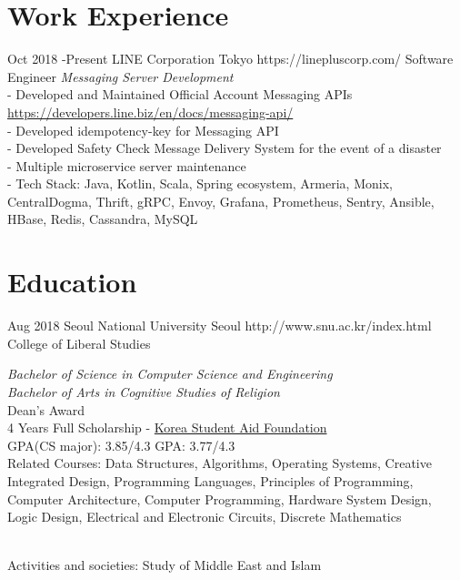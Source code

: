 \documentclass[10pt]{article} %
\begin{document}

\section{Work Experience}

\job
{Oct 2018 -}{Present}
{LINE Corporation}
{Tokyo}
{https://linepluscorp.com/}
{Software Engineer}
{
\textit{Messaging Server Development}\\
- Developed and Maintained Official Account Messaging APIs \href{https://developers.line.biz/en/docs/messaging-api/}{https://developers.line.biz/en/docs/messaging-api/}\\
- Developed idempotency-key for Messaging API\\
- Developed Safety Check Message Delivery System for the event of a disaster\\
- Multiple microservice server maintenance\\
- Tech Stack: Java, Kotlin, Scala, Spring ecosystem, Armeria, Monix, CentralDogma, Thrift, gRPC, Envoy, Grafana, Prometheus, Sentry, Ansible, HBase, Redis, Cassandra, MySQL
}



\section{Education}

\job
{Aug 2018}{}
{Seoul National University}
{Seoul}
{http://www.snu.ac.kr/index.html}
{College of Liberal Studies}
{
\textit{Bachelor of Science in Computer Science and Engineering}\\
\if{}
\textit{Bachelor of Arts in Cognitive Studies of Religion}\\
\fi
Dean's Award\\
4 Years Full Scholarship - \href{http://eng.kosaf.go.kr/jsp/main.jsp}{Korea Student Aid Foundation}\\
\if{}
GPA(CS major): 3.85/4.3\hspace{10mm} GPA: 3.77/4.3\\
Related Courses: Data Structures, Algorithms, Operating Systems, Creative Integrated Design, Programming Languages, Principles of Programming, Computer Architecture, Computer Programming, Hardware System Design, Logic Design, Electrical and Electronic Circuits, Discrete Mathematics

\\
Activities and societies: Study of Middle East and Islam
\fi
}
\end{document}
